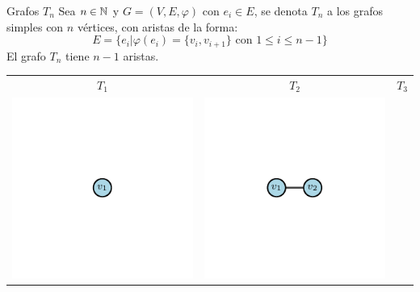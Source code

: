         \begin{definition}{Grafos $T_n$}
            Sea $n\in\mathbb{N}$ y $G=(V,E,\varphi)$ con $e_i\in E$, se denota $T_n$ a los grafos simples con $n$ vértices, con aristas de la forma:
            $$E=\{e_i|\varphi(e_i)=\{v_i,v_{i+1}\}\text{ con }1\le i\le n-1\}$$
            El grafo $T_n$ tiene $n-1$ aristas.
        \end{definition}
        \begin{table}[H]
            \begin{center}
                \begin{tabular}{ccc}
                
                    \textbf{$T_1$} & \textbf{$T_2$} & \textbf{$T_3$} \\
                    \includegraphics{Sections/Graphs/GraphsImages/GraphsTn/T1.pdf}
                    \centering 
                    &
                    \includegraphics{Sections/Graphs/GraphsImages/GraphsTn/T2.pdf}
                    &

\end{tabular}
\end{center}
\end{table}
